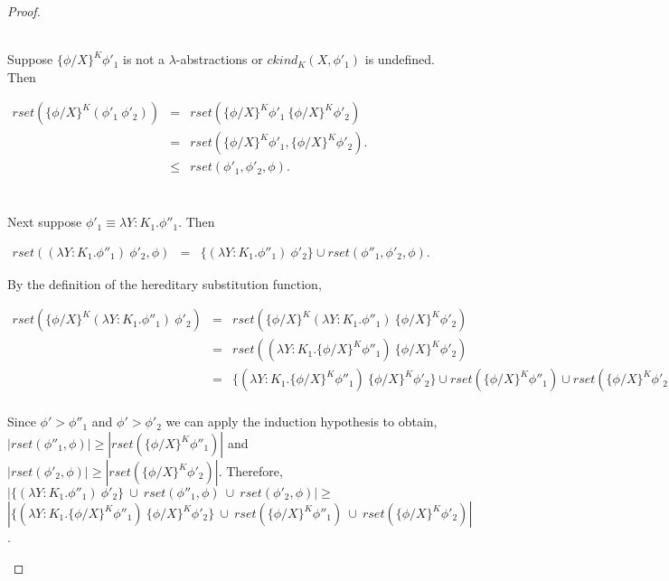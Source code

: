 \begin{proof}
\begin{itemize}
    \ \\
    \noindent
    Suppose $\{\phi/X\}^K \phi'_1$ is not a $\lambda$-abstractions or $ckind_K(X,\phi'_1)$ is undefined.  Then
    \begin{center}
      \begin{math}
        \begin{array}{lll}
          rset(\{\phi/X\}^K (\phi'_1\ \phi'_2)) & = & rset(\{\phi/X\}^K \phi'_1\ \{\phi/X\}^K \phi'_2)\\
          & = & rset(\{\phi/X\}^K \phi'_1, \{\phi/X\}^K \phi'_2).\\
          & \leq & rset(\phi'_1, \phi'_2, \phi).\\
        \end{array}
      \end{math}
    \end{center}
  
    \ \\
    Next suppose $\phi'_1 \equiv \lambda Y:K_1.\phi''_1$.  Then 
    \begin{center}
      \begin{math}
        \begin{array}{lll}
          rset((\lambda Y:K_1.\phi''_1)\ \phi'_2, \phi) & = & \{ (\lambda Y:K_1.\phi''_1)\ \phi'_2\} \cup rset(\phi''_1, \phi'_2, \phi).
        \end{array}
      \end{math}
    \end{center}
    By the definition of the hereditary substitution function,
    \begin{center}
      \begin{math}
        \begin{array}{lll}
          rset(\{\phi/X\}^K (\lambda Y:K_1.\phi''_1)\ \phi'_2) & = & rset(\{\phi/X\}^K (\lambda Y:K_1.\phi''_1)\ \{\phi/X\}^K \phi'_2)\\
          & = & rset((\lambda Y:K_1.\{\phi/X\}^K \phi''_1)\ \{\phi/X\}^K \phi'_2)\\
          & = & \{(\lambda Y:K_1.\{\phi/X\}^K \phi''_1)\ \{\phi/X\}^K \phi'_2\} \cup 
          rset(\{\phi/X\}^K \phi''_1) \cup rset(\{\phi/X\}^K \phi'_2).\\
        \end{array}
      \end{math}
    \end{center}
    Since $\phi' > \phi''_1$ and $\phi' > \phi'_2$ we can apply the induction hypothesis to obtain,
    $|rset(\phi''_1, \phi)| \geq |rset(\{\phi/X\}^K \phi''_1)|$ and $|rset(\phi'_2,\phi)| \geq |rset(\{\phi/X\}^K \phi'_2)|$.  Therefore, \\
    $|\{ (\lambda Y:K_1.\phi''_1)\ \phi'_2\}\ \cup\ rset(\phi''_1,\phi)\ \cup\ rset(\phi'_2,\phi)| \geq $ 
    $|\{(\lambda Y:K_1.\{\phi/X\}^K \phi''_1)\ \{\phi/X\}^K \phi'_2\}\ \cup\ rset(\{\phi/X\}^K \phi''_1)\ \cup\ rset(\{\phi/X\}^K \phi'_2)|$.
  \end{itemize}
\end{proof}


